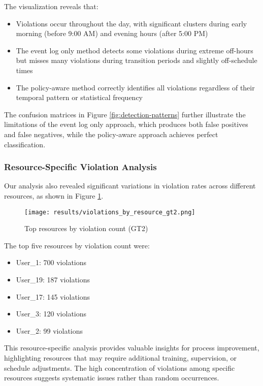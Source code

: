 The visualization reveals that:

\begin{itemize}
    \item Violations occur throughout the day, with significant clusters during early morning (before 9:00 AM) and evening hours (after 5:00 PM)
    \item The event log only method detects some violations during extreme off-hours but misses many violations during transition periods and slightly off-schedule times
    \item The policy-aware method correctly identifies all violations regardless of their temporal pattern or statistical frequency
\end{itemize}

The confusion matrices in Figure \ref{fig:detection-patterns} further illustrate the limitations of the event log only approach, which produces both false positives and false negatives, while the policy-aware approach achieves perfect classification.

\subsubsection{Resource-Specific Violation Analysis}

Our analysis also revealed significant variations in violation rates across different resources, as shown in Figure \ref{fig:resource-violations}.

\begin{figure}[h]
\centering
\texttt{[image: results/violations\_by\_resource\_gt2.png]}
\caption{Top resources by violation count (GT2)}
\label{fig:resource-violations}
\end{figure}

The top five resources by violation count were:
\begin{itemize}
    \item User\_1: 700 violations
    \item User\_19: 187 violations
    \item User\_17: 145 violations
    \item User\_3: 120 violations
    \item User\_2: 99 violations
\end{itemize}

This resource-specific analysis provides valuable insights for process improvement, highlighting resources that may require additional training, supervision, or schedule adjustments. The high concentration of violations among specific resources suggests systematic issues rather than random occurrences.

